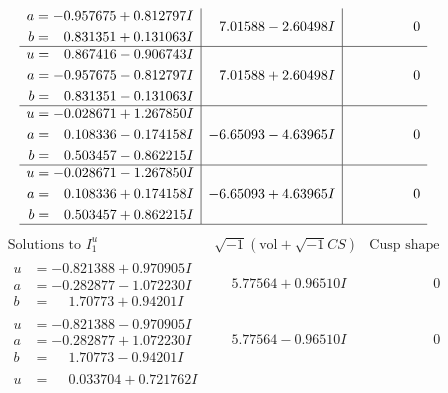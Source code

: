 \documentclass[1p]{elsarticle_modified}
\theoremstyle{definition}
\newcommand{\I}{\sqrt{-1}}
\begin{document}
$$\begin{array}{c|c|c}
\begin{aligned}
a &= -0.957675 + 0.812797 I \\
b &= \phantom{-}0.831351 + 0.131063 I\end{aligned}
 & \phantom{-}7.01588 - 2.60498 I & \phantom{-0.000000 } 0 \\ \hline\begin{aligned}
u &= \phantom{-}0.867416 - 0.906743 I \\
a &= -0.957675 - 0.812797 I \\
b &= \phantom{-}0.831351 - 0.131063 I\end{aligned}
 & \phantom{-}7.01588 + 2.60498 I & \phantom{-0.000000 } 0 \\ \hline\begin{aligned}
u &= -0.028671 + 1.267850 I \\
a &= \phantom{-}0.108336 - 0.174158 I \\
b &= \phantom{-}0.503457 - 0.862215 I\end{aligned}
 & -6.65093 - 4.63965 I & \phantom{-0.000000 } 0 \\ \hline\begin{aligned}
u &= -0.028671 - 1.267850 I \\
a &= \phantom{-}0.108336 + 0.174158 I \\
b &= \phantom{-}0.503457 + 0.862215 I\end{aligned}
 & -6.65093 + 4.63965 I & \phantom{-0.000000 } 0\\
 \hline 
 \end{array}$$\newpage$$\begin{array}{c|c|c}  
\text{Solutions to }I^u_{1}& \I (\text{vol} + \sqrt{-1}CS) & \text{Cusp shape}\\
 \hline 
\begin{aligned}
u &= -0.821388 + 0.970905 I \\
a &= -0.282877 - 1.072230 I \\
b &= \phantom{-}1.70773 + 0.94201 I\end{aligned}
 & \phantom{-}5.77564 + 0.96510 I & \phantom{-0.000000 } 0 \\ \hline\begin{aligned}
u &= -0.821388 - 0.970905 I \\
a &= -0.282877 + 1.072230 I \\
b &= \phantom{-}1.70773 - 0.94201 I\end{aligned}
 & \phantom{-}5.77564 - 0.96510 I & \phantom{-0.000000 } 0 \\ \hline\begin{aligned}
u &= \phantom{-}0.033704 + 0.721762 I \\

\end{aligned}
\end{array}$$
\end{document}
